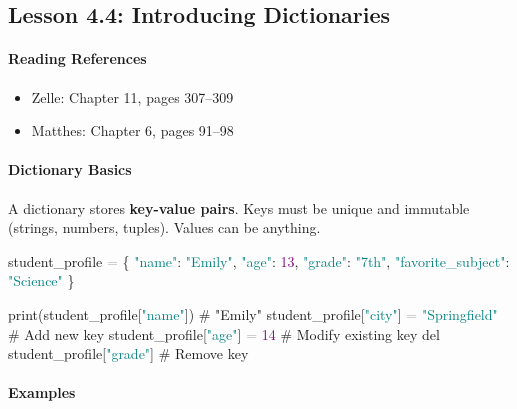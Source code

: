\documentclass[
  justified,
  openright,
]{tufte-book}
\let\subsubsection\paragraph
\let\paragraph\paragraph
\newcommand{\BuiltInTok}[1]{#1}
\newcommand{\CommentTok}[1]{\textcolor{MidGray}{#1}}
\newcommand{\DecValTok}[1]{\textcolor{Purple}{#1}}
\newcommand{\KeywordTok}[1]{\textcolor{BrandBlue}{#1}}
\newcommand{\NormalTok}[1]{#1}
\newcommand{\OperatorTok}[1]{\textcolor{DarkGray}{#1}}
\newcommand{\StringTok}[1]{\textcolor{Teal}{#1}}
\newenvironment{Shaded}{%
  \begin{snugshade}
}{%
  \end{snugshade}
}
\let\subsubsection\paragraph
\let\paragraph\paragraph
\providecommand{\tightlist}{%
  \setlength{\itemsep}{0pt}\setlength{\parskip}{0pt}}
\begin{document}
\subsection{Lesson 4.4: Introducing
Dictionaries}\label{lesson-4.4-introducing-dictionaries}

\subsubsection{Reading References}\label{reading-references-17}

\begin{itemize}
\tightlist
\item
  Zelle: Chapter 11, pages 307--309
\item
  Matthes: Chapter 6, pages 91--98
\end{itemize}

\subsubsection{Dictionary Basics}\label{dictionary-basics}

A dictionary stores \textbf{key-value pairs}. Keys must be unique and
immutable (strings, numbers, tuples). Values can be anything.

\begin{Shaded}
\begin{Highlighting}[]
\NormalTok{student\_profile }\OperatorTok{=}\NormalTok{ \{}
    \StringTok{"name"}\NormalTok{: }\StringTok{"Emily"}\NormalTok{,}
    \StringTok{"age"}\NormalTok{: }\DecValTok{13}\NormalTok{,}
    \StringTok{"grade"}\NormalTok{: }\StringTok{"7th"}\NormalTok{,}
    \StringTok{"favorite\_subject"}\NormalTok{: }\StringTok{"Science"}
\NormalTok{\}}

\BuiltInTok{print}\NormalTok{(student\_profile[}\StringTok{"name"}\NormalTok{])      }\CommentTok{\# "Emily"}
\NormalTok{student\_profile[}\StringTok{"city"}\NormalTok{] }\OperatorTok{=} \StringTok{"Springfield"}   \CommentTok{\# Add new key}
\NormalTok{student\_profile[}\StringTok{"age"}\NormalTok{] }\OperatorTok{=} \DecValTok{14}              \CommentTok{\# Modify existing key}
\KeywordTok{del}\NormalTok{ student\_profile[}\StringTok{"grade"}\NormalTok{]             }\CommentTok{\# Remove key}
\end{Highlighting}
\end{Shaded}

\subsubsection{Examples}\label{examples-10}
\end{document}
